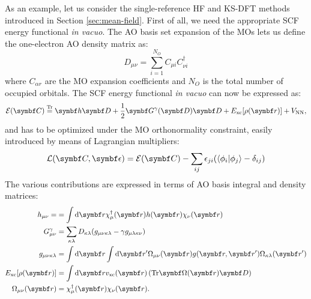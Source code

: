 As an example, let us consider the single-reference \acrshort{HF} and
\acrshort{KS}-\acrshort{DFT} methods introduced in Section
\ref{sec:mean-field}.
First of all, we need the appropriate \acrshort{SCF} energy functional
\emph{in vacuo}.
The \acrshort{AO} basis set expansion of the \glspl{MO} lets us define
the one-electron \acrshort{AO} density matrix as:
\begin{equation}
  D_{\mu\nu} = \sum_{i=1}^{N_O}C_{\mu i}C^\dagger_{\nu i}
\end{equation}
where $C_{\alpha r}$ are the \acrshort{MO} expansion coefficients and
$N_O$ is the total number of occupied orbitals.
The \acrshort{SCF} energy functional \emph{in vacuo} can now be
expressed as:
\begin{equation}\label{eq:scf-functional}
  \mathcal{E}(\mat{C}) \eqtr \mat{h}\mat{D} + \frac{1}{2}
  \mat{G}^\gamma(\mat{D})\mat{D} + E_\mathrm{xc}[\rho(\vect{r})] +
  V_\mathrm{NN},
\end{equation}
and has to be optimized under the \acrshort{MO} orthonormality
constraint, easily introduced by means of Lagrangian multipliers:
\begin{equation}\label{eq:scf-lagrangian}
  \mathcal{L}(\mat{C}, \mat{\epsilon}) = \mathcal{E}(\mat{C}) -
  \sum_{ij}\epsilon_{ji}(\braket{\phi_i|\phi_j} - \delta_{ij})
\end{equation}
The various contributions are expressed in terms of \acrshort{AO} basis
integral and density matrices:
\begin{subequations}
  \begin{align}
  h_{\mu\nu} = &= \int \diff\vect{r}
  \chi_\mu^\dagger(\vect{r})h(\vect{r})\chi_\nu(\vect{r}) \label{eq:ao-one-el} \\
  G_{\mu\nu}^\gamma &=
  \sum_{\kappa\lambda}D_{\kappa\lambda}(g_{\mu\nu\kappa\lambda} -
  \gamma g_{\mu\lambda\kappa\nu}) \label{eq:two-el-matrix} \\
  g_{\mu\nu\kappa\lambda} &=
  \int\diff\vect{r}\int\diff\vect{r}^\prime
  \Omega_{\mu\nu}(\vect{r}) g(\vect{r},\vect{r}^\prime)
  \Omega_{\kappa\lambda}(\vect{r}^\prime) \label{eq:ao-two-el} \\
  E_\mathrm{xc}[\rho(\vect{r})] &=
  \int\diff\vect{r}
  v_\mathrm{xc}(\vect{r})\left(\Tr\mat{\Omega}(\vect{r})\mat{D}\right) \label{eq:ao-xc} \\
  \Omega_{\mu\nu}(\vect{r}) &= \chi_\mu^\dagger(\vect{r})\chi_\nu(\vect{r}).
  \label{eq:ao-overlap}
  \end{align}
\end{subequations}
